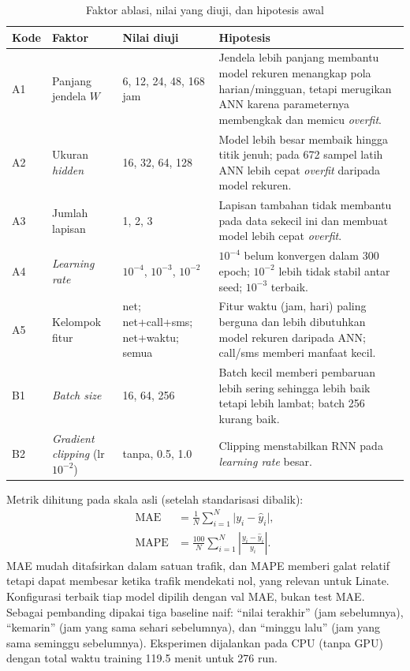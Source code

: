 \documentclass[conference,a4paper]{IEEEtran}
\begin{document}
\begin{table}[t]
  \centering
  \caption{Faktor ablasi, nilai yang diuji, dan hipotesis awal}
  \label{tab:faktor}
  \scriptsize
  \setlength{\tabcolsep}{2.5pt}
  \begin{tabular}{@{}llp{1.9cm}p{3.6cm}@{}}
    \toprule
    Kode & Faktor & Nilai diuji & Hipotesis \\
    \midrule
    A1 & Panjang jendela $W$ & 6, 12, 24, 48, 168 jam & Jendela lebih panjang membantu model rekuren menangkap pola harian/mingguan, tetapi merugikan ANN karena parameternya membengkak dan memicu \textit{overfit}. \\
    A2 & Ukuran \textit{hidden} & 16, 32, 64, 128 & Model lebih besar membaik hingga titik jenuh; pada 672 sampel latih ANN lebih cepat \textit{overfit} daripada model rekuren. \\
    A3 & Jumlah lapisan & 1, 2, 3 & Lapisan tambahan tidak membantu pada data sekecil ini dan membuat model lebih cepat \textit{overfit}. \\
    A4 & \textit{Learning rate} & $10^{-4}$, $10^{-3}$, $10^{-2}$ & $10^{-4}$ belum konvergen dalam 300 epoch; $10^{-2}$ lebih tidak stabil antar seed; $10^{-3}$ terbaik. \\
    A5 & Kelompok fitur & net; net+call+sms; net+waktu; semua & Fitur waktu (jam, hari) paling berguna dan lebih dibutuhkan model rekuren daripada ANN; call/sms memberi manfaat kecil. \\
    B1 & \textit{Batch size} & 16, 64, 256 & Batch kecil memberi pembaruan lebih sering sehingga lebih baik tetapi lebih lambat; batch 256 kurang baik. \\
    B2 & \textit{Gradient clipping} (lr $10^{-2}$) & tanpa, 0.5, 1.0 & Clipping menstabilkan RNN pada \textit{learning rate} besar. \\
    \bottomrule
  \end{tabular}
\end{table}
 
Metrik dihitung pada skala asli (setelah standarisasi dibalik):
\begin{align}
\text{MAE}&=\frac{1}{N}\sum_{i=1}^{N}\lvert y_i-\hat{y}_i\rvert,\\
\text{MAPE}&=\frac{100}{N}\sum_{i=1}^{N}\left\lvert\frac{y_i-\hat{y}_i}{y_i}\right\rvert.
\end{align}
MAE mudah ditafsirkan dalam satuan trafik, dan MAPE memberi galat relatif tetapi dapat membesar ketika trafik mendekati nol, yang relevan untuk Linate. Konfigurasi terbaik tiap model dipilih dengan val MAE, bukan test MAE. Sebagai pembanding dipakai tiga baseline naif: ``nilai terakhir'' (jam sebelumnya), ``kemarin'' (jam yang sama sehari sebelumnya), dan ``minggu lalu'' (jam yang sama seminggu sebelumnya). Eksperimen dijalankan pada CPU (tanpa GPU) dengan total waktu training 119.5 menit untuk 276 run.
 
\end{document}
